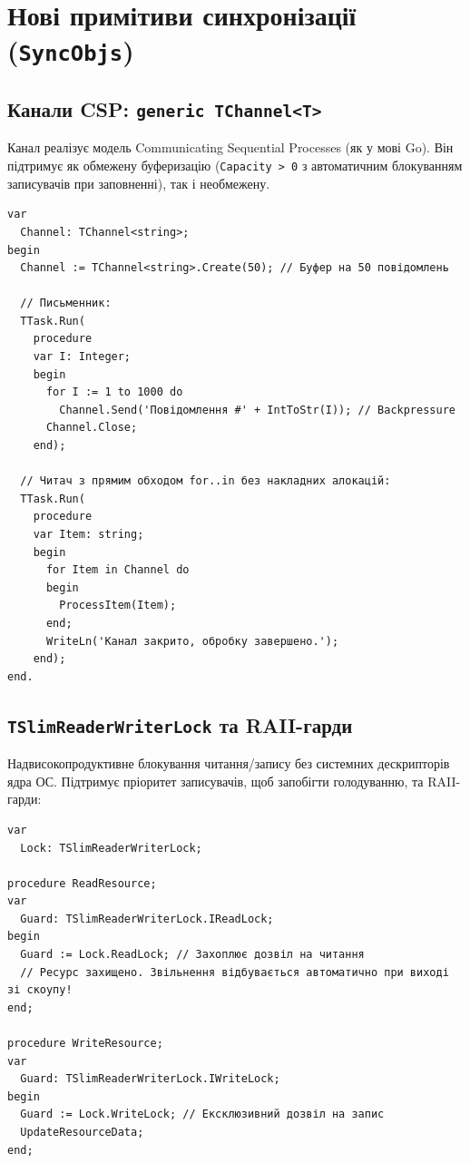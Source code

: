 \documentclass[11pt,a4paper]{article}
\begin{document}
\newpage

\section{Нові примітиви синхронізації (\texttt{SyncObjs})}

\subsection{Канали CSP: \texttt{generic TChannel<T>}}
Канал реалізує модель Communicating Sequential Processes (як у мові Go). Він підтримує як обмежену буферизацію (\texttt{Capacity > 0} з автоматичним блокуванням записувачів при заповненні), так і необмежену.

\begin{lstlisting}
var
  Channel: TChannel<string>;
begin
  Channel := TChannel<string>.Create(50); // Буфер на 50 повідомлень

  // Письменник:
  TTask.Run(
    procedure
    var I: Integer;
    begin
      for I := 1 to 1000 do
        Channel.Send('Повідомлення #' + IntToStr(I)); // Backpressure
      Channel.Close;
    end);

  // Читач з прямим обходом for..in без накладних алокацій:
  TTask.Run(
    procedure
    var Item: string;
    begin
      for Item in Channel do
      begin
        ProcessItem(Item);
      end;
      WriteLn('Канал закрито, обробку завершено.');
    end);
end.
\end{lstlisting}

\subsection{\texttt{TSlimReaderWriterLock} та RAII-гарди}
Надвисокопродуктивне блокування читання/запису без системних дескрипторів ядра ОС. Підтримує пріоритет записувачів, щоб запобігти голодуванню, та RAII-гарди:

\begin{lstlisting}
var
  Lock: TSlimReaderWriterLock;

procedure ReadResource;
var
  Guard: TSlimReaderWriterLock.IReadLock;
begin
  Guard := Lock.ReadLock; // Захоплює дозвіл на читання
  // Ресурс захищено. Звільнення відбувається автоматично при виході зі скоупу!
end;

procedure WriteResource;
var
  Guard: TSlimReaderWriterLock.IWriteLock;
begin
  Guard := Lock.WriteLock; // Ексклюзивний дозвіл на запис
  UpdateResourceData;
end;
\end{lstlisting}
\end{document}
